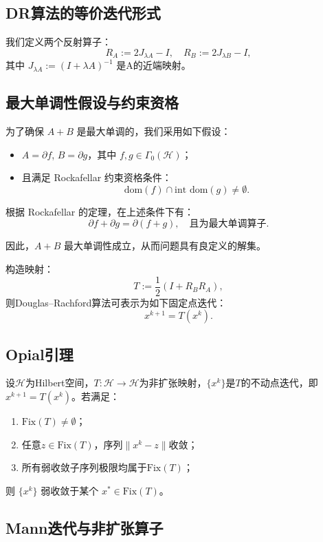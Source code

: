\subsection{DR算法的等价迭代形式}

我们定义两个反射算子：
\[
R_A := 2J_{\lambda A} - I, \quad R_B := 2J_{\lambda B} - I,
\]
其中 $J_{\lambda A} := (I + \lambda A)^{-1}$ 是A的近端映射。
\subsection{最大单调性假设与约束资格}

为了确保 $A + B$ 是最大单调的，我们采用如下假设：
\begin{itemize}
	\item $A = \partial f$, $B = \partial g$，其中 $f, g \in \Gamma_0(\mathcal{H})$；
	\item 且满足 Rockafellar 约束资格条件：
	\[
	\text{dom}(f) \cap \text{int dom}(g) \neq \emptyset.
	\]
\end{itemize}

根据 Rockafellar 的定理，在上述条件下有：
\[
\partial f + \partial g = \partial(f + g), \quad \text{且为最大单调算子}.
\]

因此，$A + B$ 最大单调性成立，从而问题具有良定义的解集。

构造映射：
\[
T := \frac{1}{2}(I + R_B R_A),
\]
则Douglas–Rachford算法可表示为如下固定点迭代：
\[
x^{k+1} = T(x^k).
\]

\subsection{Opial引理}

\begin{lemma}[Opial引理]
	设$\mathcal{H}$为Hilbert空间，$T: \mathcal{H} \to \mathcal{H}$为非扩张映射，$\{x^k\}$是$T$的不动点迭代，即$x^{k+1} = T(x^k)$。若满足：
	\begin{enumerate}
		\item $\text{Fix}(T) \neq \emptyset$；
		\item 任意$z \in \text{Fix}(T)$，序列$\|x^k - z\|$收敛；
		\item 所有弱收敛子序列极限均属于$\text{Fix}(T)$；
	\end{enumerate}
	则 $\{x^k\}$ 弱收敛于某个 $x^\ast \in \text{Fix}(T)$。
\end{lemma}

\subsection{Mann迭代与非扩张算子}

